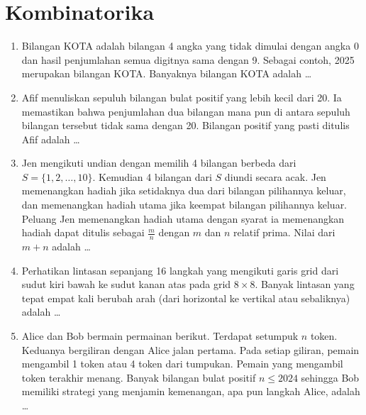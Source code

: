 \documentclass[12pt]{scrartcl}
\begin{document}
\section{Kombinatorika}
\begin{enumerate}[resume]
	\item Bilangan KOTA adalah bilangan 4 angka yang tidak dimulai dengan angka 0 dan hasil
	penjumlahan semua digitnya sama dengan 9. Sebagai contoh, 2025 merupakan bilangan KOTA.
	Banyaknya bilangan KOTA adalah \dots

	\item Afif menuliskan sepuluh bilangan bulat positif yang lebih kecil dari 20.
	Ia memastikan bahwa penjumlahan dua bilangan mana pun di antara sepuluh bilangan tersebut
	tidak sama dengan 20. Bilangan positif yang pasti ditulis Afif adalah \dots

	\item Jen mengikuti undian dengan memilih 4 bilangan berbeda dari
	$S=\{1,2,\dots,10\}$. Kemudian 4 bilangan dari $S$ diundi secara acak.
	Jen memenangkan hadiah jika setidaknya dua dari bilangan pilihannya keluar,
	dan memenangkan hadiah utama jika keempat bilangan pilihannya keluar.
	Peluang Jen memenangkan hadiah utama dengan syarat ia memenangkan hadiah
	dapat ditulis sebagai $\frac{m}{n}$ dengan $m$ dan $n$ relatif prima.
	Nilai dari $m+n$ adalah \dots

	\item Perhatikan lintasan sepanjang 16 langkah yang mengikuti garis grid dari sudut
	kiri bawah ke sudut kanan atas pada grid $8\times 8$.
	Banyak lintasan yang tepat empat kali berubah arah
	(dari horizontal ke vertikal atau sebaliknya) adalah \dots

	\item Alice dan Bob bermain permainan berikut. Terdapat setumpuk $n$ token.
	Keduanya bergiliran dengan Alice jalan pertama.
	Pada setiap giliran, pemain mengambil 1 token atau 4 token dari tumpukan.
	Pemain yang mengambil token terakhir menang.
	Banyak bilangan bulat positif $n\le 2024$ sehingga Bob memiliki strategi
	yang menjamin kemenangan, apa pun langkah Alice, adalah \dots
\end{enumerate}
\end{document}

